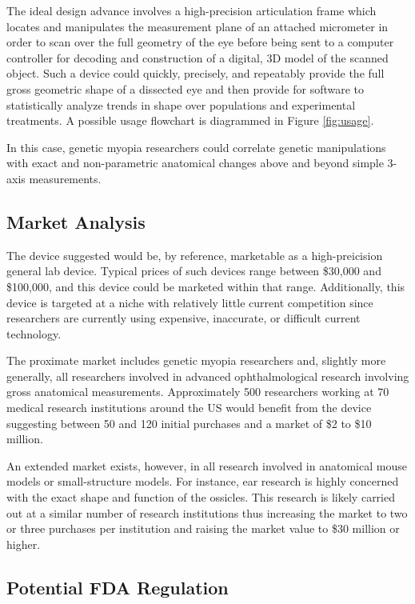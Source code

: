 \documentclass{article}
\begin{document}
The ideal design advance involves a high-precision articulation frame
which locates and manipulates the measurement plane of an attached
micrometer in order to scan over the full geometry of the eye before
being sent to a computer controller for decoding and construction of a
digital, 3D model of the scanned object. Such a device could quickly,
precisely, and repeatably provide the full gross geometric shape of a
dissected eye and then provide for software to statistically analyze
trends in shape over populations and experimental treatments. A possible usage flowchart is diagrammed in Figure \ref{fig:usage}.

In this case, genetic myopia researchers could correlate genetic
manipulations with exact and non-parametric anatomical changes above
and beyond simple 3-axis measurements.

\subsection{Market Analysis}
\label{sec:market-analysis}

The device suggested would be, by reference, marketable as a
high-preicision general lab device. Typical prices of such devices range between
\$30,000 and \$100,000, and this device could be marketed within that
range. Additionally, this device is targeted at a niche with
relatively little current competition since researchers are currently using expensive, inaccurate, or difficult current technology.

The proximate market includes genetic myopia researchers and, slightly
more generally, all researchers involved in advanced ophthalmological
research involving gross anatomical measurements. Approximately 500
researchers working at 70 medical research institutions around the US
would benefit from the device suggesting between 50 and 120 initial
purchases and a market of \$2 to \$10 million.

An extended market exists, however, in all research involved in
anatomical mouse models or small-structure models. For instance,
ear research is highly concerned with the exact shape and function of
the ossicles. This research is likely carried out at a similar number
of research institutions thus increasing the market to two or three
purchases per institution and raising the market value to \$30 million
or higher.

\subsection{Potential FDA Regulation}
\label{sec:potent-fda}
\end{document}
